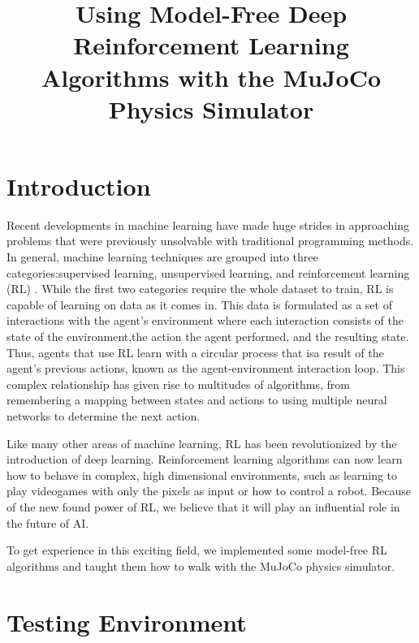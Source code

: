 \documentclass[conference]{IEEEtran}
\begin{document}
\title{Using Model-Free Deep Reinforcement Learning Algorithms with the MuJoCo Physics Simulator}

\author{
    \and
}
\maketitle

\begin{abstract}
    \blindtext
\end{abstract}

\section{Introduction}

Recent developments in machine learning have made huge strides in approaching problems that were previously unsolvable with traditional programming methods. In general, machine learning techniques are grouped into three categories:supervised learning, unsupervised learning, and reinforcement learning (RL) \cite{rl_application}. While the first two categories require the whole dataset to train, RL is capable of learning on data as it comes in. This data is formulated as a set of interactions with the agent's environment where each interaction consists of the state of the environment,the action the agent performed, and the resulting state. Thus, agents that use RL learn with a circular process that isa result of the agent's previous actions, known as the agent-environment interaction loop. This complex relationship has given rise to multitudes of algorithms, from remembering a mapping between states and actions to using multiple neural networks to determine the next action.

Like many other areas of machine learning, RL has been revolutionized by the introduction of deep learning. Reinforcement learning algorithms can now learn how to behave in complex, high dimensional environments, such as learning to play videogames with only the pixels as input or how to control a robot. Because of the new found power of RL, we believe that it will play an influential role in the future of AI.

To get experience in this exciting field, we implemented some model-free RL algorithms and taught them how to walk with the MuJoCo physics simulator.

\section{Testing Environment}
\end{document}
